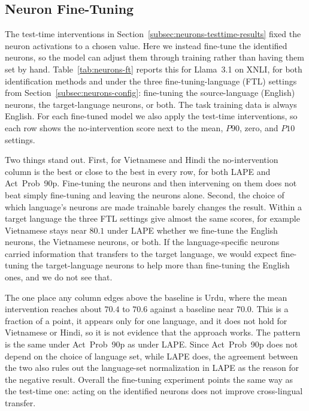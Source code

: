 \subsection{Neuron Fine-Tuning}
\label{subsec:neurons-ft}

The test-time interventions in
Section~\ref{subsec:neurons-testtime-results} fixed the neuron activations to a
chosen value. Here we instead fine-tune the identified neurons, so the model can
adjust them through training rather than having them set by hand.
Table~\ref{tab:neurons-ft} reports this for Llama~3.1 on XNLI, for both
identification methods and under the three fine-tuning-language (FTL) settings from
Section~\ref{subsec:neurons-config}: fine-tuning the source-language (English)
neurons, the target-language neurons, or both. The task training data is always
English. For each fine-tuned model we also apply the test-time interventions, so
each row shows the no-intervention score next to the mean, $P90$, zero, and $P10$
settings.

Two things stand out. First, for Vietnamese and Hindi the no-intervention column is
the best or close to the best in every row, for both LAPE and Act~Prob~90p.
Fine-tuning the neurons and then intervening on them does not beat simply
fine-tuning and leaving the neurons alone. Second, the choice of which language's
neurons are made trainable barely changes the result. Within a target language the
three FTL settings give almost the same scores, for example Vietnamese stays near
$80.1$ under LAPE whether we fine-tune the English neurons, the Vietnamese neurons,
or both. If the language-specific neurons carried information that transfers to the
target language, we would expect fine-tuning the target-language neurons to help
more than fine-tuning the English ones, and we do not see that.

The one place any column edges above the baseline is Urdu, where the mean
intervention reaches about $70.4$ to $70.6$ against a baseline near $70.0$. This is
a fraction of a point, it appears only for one language, and it does not hold for
Vietnamese or Hindi, so it is not evidence that the approach works. The pattern is
the same under Act~Prob~90p as under LAPE. Since Act~Prob~90p does not depend on the
choice of language set, while LAPE does, the agreement between the two also rules
out the language-set normalization in LAPE as the reason for the negative result.
Overall the fine-tuning experiment points the same way as the test-time one: acting
on the identified neurons does not improve cross-lingual transfer.

